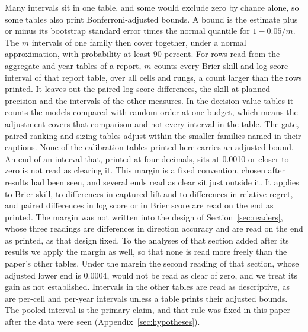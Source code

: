 \documentclass[sigconf,nonacm]{acmart}
\begin{document}
Many intervals sit in one table, and some would exclude zero by chance alone, so some tables also print Bonferroni-adjusted bounds. A bound is the estimate plus or minus its bootstrap standard error times the normal quantile for $1 - 0.05/m$. The $m$ intervals of one family then cover together, under a normal approximation, with probability at least 90 percent. For rows read from the aggregate and year tables of a report, $m$ counts every Brier skill and log score interval of that report table, over all cells and rungs, a count larger than the rows printed. It leaves out the paired log score differences, the skill at planned precision and the intervals of the other measures. In the decision-value tables it counts the models compared with random order at one budget, which means the adjustment covers that comparison and not every interval in the table. The gate, paired ranking and sizing tables adjust within the smaller families named in their captions. None of the calibration tables printed here carries an adjusted bound. An end of an interval that, printed at four decimals, sits at 0.0010 or closer to zero is not read as clearing it. This margin is a fixed convention, chosen after results had been seen, and several ends read as clear sit just outside it. It applies to Brier skill, to differences in captured lift and to differences in relative regret, and paired differences in log score or in Brier score are read on the end as printed. The margin was not written into the design of Section~\ref{sec:readers}, whose three readings are differences in direction accuracy and are read on the end as printed, as that design fixed. To the analyses of that section added after its results we apply the margin as well, so that none is read more freely than the paper's other tables. Under the margin the second reading of that section, whose adjusted lower end is 0.0004, would not be read as clear of zero, and we treat its gain as not established. Intervals in the other tables are read as descriptive, as are per-cell and per-year intervals unless a table prints their adjusted bounds. The pooled interval is the primary claim, and that rule was fixed in this paper after the data were seen (Appendix~\ref{sec:hypotheses}).
\end{document}
